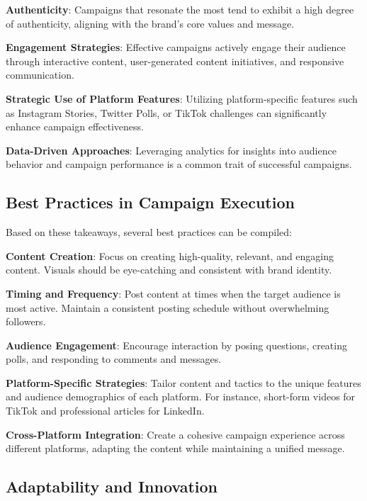 \documentclass[
]{book}
\begin{document}
\textbf{Authenticity}: Campaigns that resonate the most tend to exhibit a high degree of authenticity, aligning with the brand's core values and message.

\textbf{Engagement Strategies}: Effective campaigns actively engage their audience through interactive content, user-generated content initiatives, and responsive communication.

\textbf{Strategic Use of Platform Features}: Utilizing platform-specific features such as Instagram Stories, Twitter Polls, or TikTok challenges can significantly enhance campaign effectiveness.

\textbf{Data-Driven Approaches}: Leveraging analytics for insights into audience behavior and campaign performance is a common trait of successful campaigns.

\hypertarget{best-practices-in-campaign-execution}{%
\subsection{Best Practices in Campaign Execution}\label{best-practices-in-campaign-execution}}

Based on these takeaways, several best practices can be compiled:

\textbf{Content Creation}: Focus on creating high-quality, relevant, and engaging content. Visuals should be eye-catching and consistent with brand identity.

\textbf{Timing and Frequency}: Post content at times when the target audience is most active. Maintain a consistent posting schedule without overwhelming followers.

\textbf{Audience Engagement}: Encourage interaction by posing questions, creating polls, and responding to comments and messages.

\textbf{Platform-Specific Strategies}: Tailor content and tactics to the unique features and audience demographics of each platform. For instance, short-form videos for TikTok and professional articles for LinkedIn.

\textbf{Cross-Platform Integration}: Create a cohesive campaign experience across different platforms, adapting the content while maintaining a unified message.

\hypertarget{adaptability-and-innovation}{%
\subsection{Adaptability and Innovation}\label{adaptability-and-innovation}}
\end{document}
